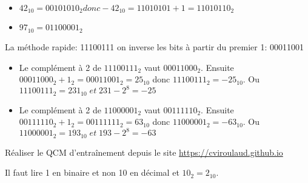 \documentclass[a4paper,11pt]{article}
\begin{document}
\begin{Form}
\begin{exo}
\begin{itemize}
\item $42_{10}=00101010_2 donc -42_{10}=11010101+1=11010110_2$
\item $97_{10}=01100001_2$
\end{itemize}
\end{exo}
\begin{exo}
\begin{commentprof}
La méthode rapide: 11100111 \rightarrow on inverse les bits à partir du premier 1: 00011001 
\end{commentprof}
\begin{itemize}
\item Le complément à 2 de $11100111_2$ vaut $00011000_2$. Ensuite $00011000_2+1_2=00011001_2=25_{10}$ donc $11100111_2=-25_{10}$. Ou $11100111_2=231_{10}\;et\;231-2^8=-25$
\item Le complément à 2 de $11000001_2$ vaut $00111110_2$. Ensuite $00111110_2+1_2=00111111_2=63_{10}$ donc $11000001_2=-63_{10}$. Ou $11000001_2=193_{10}\;et\;193-2^8=-63$
\end{itemize}
\end{exo}
\begin{exo}
Réaliser le QCM d’entraînement depuis le site \url{https://cviroulaud.github.io} 
\end{exo}
\begin{exo}
Il faut lire 1 en binaire et non 10 en décimal et $10_2=2_{10}$.
\end{exo}
\end{Form}
\end{document}
